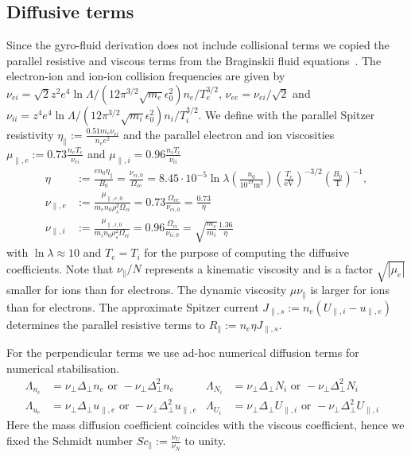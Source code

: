 \subsection{Diffusive terms}\label{sec:dissres}
Since the gyro-fluid derivation does not include collisional terms we
copied the parallel resistive and viscous terms from the Braginskii fluid equations~\cite{Braginskii1965}.
The electron-ion and ion-ion collision frequencies are given by
$\nu_{ei} = \sqrt{2} z^2 e^4 \ln \Lambda/ (12\pi^{3/2} \sqrt{m_e} \epsilon_0^2) n_e /T_e^{3/2}$, $\nu_{ee} = \nu_{ei}/\sqrt{2}$
and
$\nu_{ii} =  z^4 e^4 \ln \Lambda/ (12\pi^{3/2} \sqrt{m_i} \epsilon_0^2) n_i /T_i^{3/2}$.
We define with the parallel Spitzer resistivity
$\eta_\parallel := \frac{0.51 m_e \nu_{ei}}{n_e e^2}$ and the parallel electron and ion viscosities
$\mu_{\parallel,e}:=0.73\frac{n_eT_e}{\nu_{ei}}$ and $\mu_{\parallel,i} = 0.96\frac{n_iT_i}{\nu_{ii}}$~\cite{Braginskii1965}
\begin{subequations}
\begin{align}
    \eta&:=\frac{en_0\eta_\parallel}{B_0} = \frac{\nu_{ei,0}}{\Omega_{ce}}= 8.45\cdot 10^{-5}\ln \lambda \left(\frac{n_0}{10^{19}\text{m}^3}\right) \left(\frac{T_e}{\text{eV}}\right)^{-3/2} \left(\frac{B_0}{\text{T}}\right)^{-1}, \\
    \nu_{\parallel,e}&:=\frac{\mu_{\parallel,e,0}}{m_e n_0\rho_s^2\Omega_{ci}} = 0.73 \frac{\Omega_{ce}}{\nu_{ei,0}} = \frac{0.73}{\eta} \\
    \nu_{\parallel,i}&:=\frac{\mu_{\parallel,i,0}}{m_i n_0 \rho_s^2\Omega_{ci}} = 0.96 \frac{\Omega_{ci}}{\nu_{ii,0}} = \sqrt{\frac{m_e}{m_i}} \frac{1.36}{\eta}
\end{align}
    \label{eq:resistivity}
\end{subequations}
with $\ln \lambda \approx 10$ and $T_e=T_i$ for the purpose of computing the diffusive coefficients. Note that $\nu_\parallel/N$ represents a kinematic viscosity and is a factor $\sqrt{|\mu_e|}$ smaller for ions than for electrons.
The dynamic viscosity $\mu\nu_\parallel$ is larger for ions than for electrons.
 The approximate Spitzer current \(J_{\parallel,s}:= n_e \left(U_{\parallel,i} - u_{\parallel,e}\right)\)
 determines the parallel resistive terms to $R_\parallel:= n_e\eta J_{\parallel,s}$.

 For the perpendicular terms we use ad-hoc numerical diffusion terms for numerical
 stabilisation.
\begin{align}
\label{eq:perpdiffNT}
 \Lambda_{n_e} &=  \nu_\perp \Delta_\perp n_e \text{ or } -\nu_\perp \Delta_\perp^2 n_e&
 \Lambda_{N_i} &=  \nu_\perp \Delta_\perp N_i \text{ or } -\nu_\perp \Delta_\perp^2 N_i & \\
 \Lambda_{u_e} &=  \nu_\perp \Delta_\perp u_{\parallel,e} \text{ or } -\nu_\perp \Delta_\perp^2 u_{\parallel,e} &
 \Lambda_{U_i} &=  \nu_\perp \Delta_\perp U_{\parallel,i} \text{ or } -\nu_\perp \Delta_\perp^2 U_{\parallel,i}
\end{align}
Here the mass diffusion coefficient coincides with the viscous coefficient, hence we fixed the Schmidt number \(\mathit{Sc}_\parallel:= \frac{\nu_U}{\nu_N}\) to unity.

